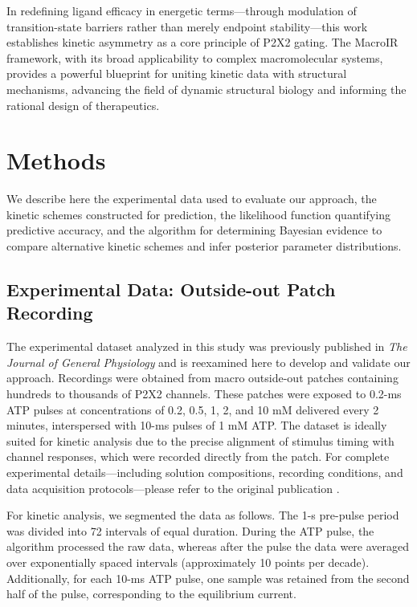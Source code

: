 \documentclass[pdflatex,sn-mathphys-num]{sn-jnl}%
\theoremstyle{thmstyleone}%
\theoremstyle{thmstyletwo}%
\theoremstyle{thmstylethree}%
\begin{document}
In redefining ligand efficacy in energetic terms—through modulation of transition-state barriers rather than merely endpoint stability—this work establishes kinetic asymmetry as a core principle of P2X2 gating. The MacroIR framework, with its broad applicability to complex macromolecular systems, provides a powerful blueprint for uniting kinetic data with structural mechanisms, advancing the field of dynamic structural biology and informing the rational design of therapeutics.


\section{Methods}\label{sec:methods}

We describe here the experimental data used to evaluate our approach, the kinetic schemes constructed for prediction, the likelihood function quantifying predictive accuracy, and the algorithm for determining Bayesian evidence to compare alternative kinetic schemes and infer posterior parameter distributions.

\subsection{Experimental Data: Outside-out Patch Recording}

The experimental dataset analyzed in this study was previously published in \textit{The Journal of General Physiology} \cite{Moffatt_hume} and is reexamined here to develop and validate our approach. Recordings were obtained from macro outside-out patches containing hundreds to thousands of P2X2 channels. These patches were exposed to 0.2-ms ATP pulses at concentrations of 0.2, 0.5, 1, 2, and 10 mM delivered every 2 minutes, interspersed with 10-ms pulses of 1 mM ATP. The dataset is ideally suited for kinetic analysis due to the precise alignment of stimulus timing with channel responses, which were recorded directly from the patch. For complete experimental details—including solution compositions, recording conditions, and data acquisition protocols—please refer to the original publication \cite{Moffatt_hume}.

For kinetic analysis, we segmented the data as follows. The 1-s pre-pulse period was divided into 72 intervals of equal duration. During the ATP pulse, the algorithm processed the raw data, whereas after the pulse the data were averaged over exponentially spaced intervals (approximately 10 points per decade). Additionally, for each 10-ms ATP pulse, one sample was retained from the second half of the pulse, corresponding to the equilibrium current.
\end{document}
